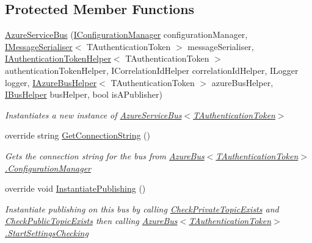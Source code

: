 \subsection*{Protected Member Functions}
\begin{DoxyCompactItemize}
\item 
\hyperlink{classCqrs_1_1Azure_1_1ServiceBus_1_1AzureServiceBus_a44845c00c29574c2fa2d43a8a6b124ca_a44845c00c29574c2fa2d43a8a6b124ca}{Azure\+Service\+Bus} (\hyperlink{interfaceCqrs_1_1Configuration_1_1IConfigurationManager}{I\+Configuration\+Manager} configuration\+Manager, \hyperlink{interfaceCqrs_1_1Azure_1_1ServiceBus_1_1IMessageSerialiser}{I\+Message\+Serialiser}$<$ T\+Authentication\+Token $>$ message\+Serialiser, \hyperlink{interfaceCqrs_1_1Authentication_1_1IAuthenticationTokenHelper}{I\+Authentication\+Token\+Helper}$<$ T\+Authentication\+Token $>$ authentication\+Token\+Helper, I\+Correlation\+Id\+Helper correlation\+Id\+Helper, I\+Logger logger, \hyperlink{interfaceCqrs_1_1Azure_1_1ServiceBus_1_1IAzureBusHelper}{I\+Azure\+Bus\+Helper}$<$ T\+Authentication\+Token $>$ azure\+Bus\+Helper, \hyperlink{interfaceCqrs_1_1Bus_1_1IBusHelper}{I\+Bus\+Helper} bus\+Helper, bool is\+A\+Publisher)
\begin{DoxyCompactList}\small\item\em Instantiates a new instance of \hyperlink{classCqrs_1_1Azure_1_1ServiceBus_1_1AzureServiceBus_a44845c00c29574c2fa2d43a8a6b124ca_a44845c00c29574c2fa2d43a8a6b124ca}{Azure\+Service\+Bus$<$\+T\+Authentication\+Token$>$} \end{DoxyCompactList}\item 
override string \hyperlink{classCqrs_1_1Azure_1_1ServiceBus_1_1AzureServiceBus_a5a3b3610dc5dfebe586262c0bc787748_a5a3b3610dc5dfebe586262c0bc787748}{Get\+Connection\+String} ()
\begin{DoxyCompactList}\small\item\em Gets the connection string for the bus from \hyperlink{classCqrs_1_1Azure_1_1ServiceBus_1_1AzureBus_aaf9469d220fb23cb0521fa76b25ab228_aaf9469d220fb23cb0521fa76b25ab228}{Azure\+Bus$<$\+T\+Authentication\+Token$>$.\+Configuration\+Manager} \end{DoxyCompactList}\item 
override void \hyperlink{classCqrs_1_1Azure_1_1ServiceBus_1_1AzureServiceBus_a5c286d29b0bbfe3770f3407efda57036_a5c286d29b0bbfe3770f3407efda57036}{Instantiate\+Publishing} ()
\begin{DoxyCompactList}\small\item\em Instantiate publishing on this bus by calling \hyperlink{classCqrs_1_1Azure_1_1ServiceBus_1_1AzureServiceBus_add2d99ff99f1af5470082b1de340c04a_add2d99ff99f1af5470082b1de340c04a}{Check\+Private\+Topic\+Exists} and \hyperlink{classCqrs_1_1Azure_1_1ServiceBus_1_1AzureServiceBus_aae464d1d93ae6600ff5ace028160dd3c_aae464d1d93ae6600ff5ace028160dd3c}{Check\+Public\+Topic\+Exists} then calling \hyperlink{classCqrs_1_1Azure_1_1ServiceBus_1_1AzureBus_acb7f47329c17646805545e78d0776efe_acb7f47329c17646805545e78d0776efe}{Azure\+Bus$<$\+T\+Authentication\+Token$>$.\+Start\+Settings\+Checking} \end{DoxyCompactList}\item 

\end{DoxyCompactItemize}
